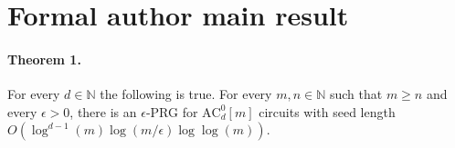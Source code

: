 \section*{Formal author main result}
\paragraph{Theorem 1.} For every $d\in\mathbb N$ the following is true. For every $m,n\in\mathbb N$ such that $m\ge n$ and every $\epsilon>0$, there is an $\epsilon$-PRG for $\mathrm{AC}^0_d[m]$ circuits with seed length $O(\log^{d-1}(m)\log(m/\epsilon)\log\log(m))$.
